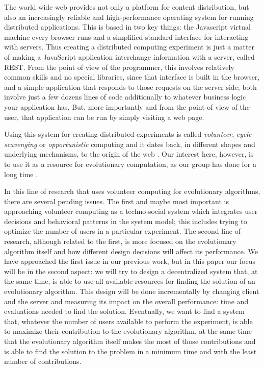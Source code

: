 \documentclass[runningheads,a4paper]{llncs}\usepackage[]{graphicx}\usepackage[]{color}
\begin{document}
The world wide web provides not only a platform for content
distribution, but also an increasingly reliable and high-performance
operating system for running distributed applications. This is based
in two key things: the Javascript virtual machine every browser runs
and a simplified standard interface for interacting with servers.
Thus creating a distributed computing experiment is just a matter of
making a JavaScript application interchange information with a server,
called REST. From the point of view of the programmer, this involves
relatively common skills and no special libraries, since that
interface is built in the browser, and a simple application that
responds to those requests on the server side; both involve just a few
dozens lines of code additionally to whatever business logic your
application has. But, more importantly and from the point of view of
the user, that application can be run by simply visiting a web page.

Using this system for creating distributed experiments is called {\em
  volunteer}, {\em cycle-scavenging} or {\em opportunistic} computing
\cite{sarmenta2001volunteer} and it dates back, in different shapes
and underlying mechanisms, to the origin of the web \cite{david-seti:home}. Our interest
here, however, is to use it as a resource for evolutionary
computation, as our group has done for a long time \cite{jj-ppsn98}.

In this line of research that uses volunteer computing for
evolutionary algorithms, there are several pending issues. The first
and maybe most important is approaching volunteer computing as a
techno-social system \cite{vespignani2009predicting} which integrates
user decisions and behavioral patterns in the system model; this
includes trying to optimize the number of users in a particular
experiment. The second line of research, although related to the
first, is more focused on the evolutionary algorithm itself and how
different design decisions will affect its performance.
We have approached the first issue in our previous work,
but in this paper our focus will be in the second aspect: we will try to
design a decentralized system that, at the same time, is able to use
all available resources for finding the solution of an evolutionary algorithm. This design will be done incrementally by
changing client and the server and measuring its
impact on the overall performance: time and evaluations needed to find
the solution. Eventually, we want to find a system that, whatever the
number of users available to perform the experiment, is able to
maximize their contribution to the evolutionary algorithm, at the same
time that the evolutionary algorithm itself makes the most of those
contributions and is able to find
the solution to the problem in a minimum time and with the least
number of contributions.
\end{document}
